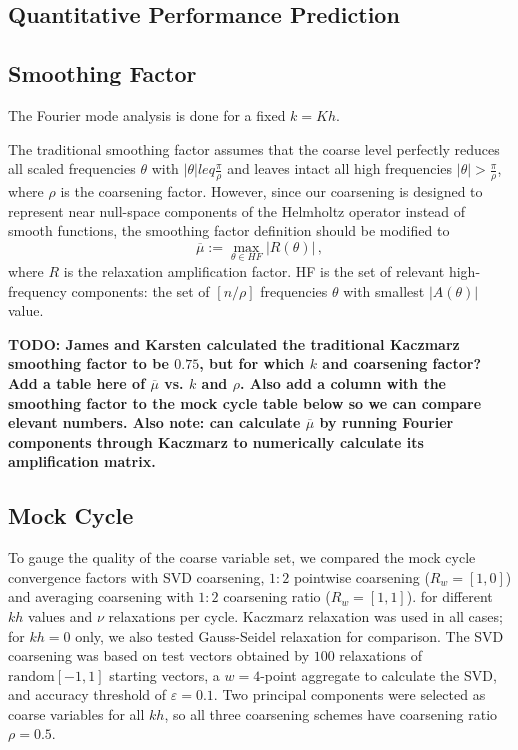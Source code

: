 \documentclass{article}
\begin{document}
\subsection{Quantitative Performance Prediction}

\subsection{Smoothing Factor}
The Fourier mode analysis is done for a fixed $k = K h$.

The traditional smoothing factor \cite[Sec. ??]{guide} assumes that the coarse level perfectly reduces all scaled frequencies $\theta$ with $|\theta| leq \frac{\pi}{\rho}$ and leaves intact all high frequencies $|\theta| > \frac{\pi}{\rho}$, where $\rho$ is the coarsening factor. However, since our coarsening is designed to represent near null-space components of the Helmholtz operator instead of smooth functions, the smoothing factor definition should be modified to
\begin{equation}
	\overline{\mu} := \max_{\theta \in HF} \left| R(\theta) \right|\,,
\end{equation}
where $R$ is the relaxation amplification factor. HF is the set of relevant high-frequency components: the set of $[n/\rho]$ frequencies $\theta$ with smallest $|A(\theta)|$ value.

{\bf TODO: James and Karsten calculated the traditional Kaczmarz smoothing factor to be $0.75$, but for which $k$ and coarsening factor? Add a table here of $\overline{\mu}$ vs. $k$ and $\rho$. Also add a column with the smoothing factor to the mock cycle table below so we can compare elevant numbers. Also note: can calculate $\overline{\mu}$ by running Fourier components through Kaczmarz to numerically calculate its amplification matrix.}

\subsection{Mock Cycle}
\label{mock_cycle}
To gauge the quality of the coarse variable set, we compared the mock cycle convergence factors with SVD coarsening, $1:2$ pointwise coarsening ($R_w = [1, 0]$) and averaging coarsening with $1:2$ coarsening ratio ($R_w = [1, 1]$). for different $kh$ values and $\nu$ relaxations per cycle. Kaczmarz relaxation was used in all cases; for $kh=0$ only, we also tested Gauss-Seidel relaxation for comparison. The SVD coarsening was based on test vectors obtained by $100$ relaxations of $\text{random}[-1,1]$ starting vectors, a $w=4$-point aggregate to calculate the SVD, and accuracy threshold of  $\varepsilon=0.1$. Two principal components were selected as coarse variables for all $kh$, so all three coarsening schemes have coarsening ratio $\rho = 0.5$.
 
\end{document}
